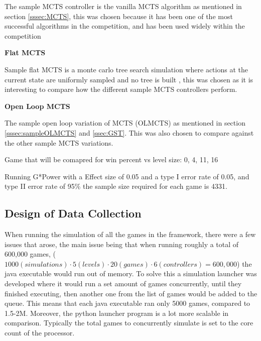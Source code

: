 \documentclass[journal]{IEEEtran}
\begin{document}
	The sample MCTS controller is the vanilla MCTS algorithm as mentioned in section \ref{sssec:MCTS}, this was chosen because it has been one of the most successful algorithms in the competition, and has been used widely within the competition \cite{perez20162014, perez2018general}

	\textbf{Flat MCTS}

	Sample flat MCTS is a monte carlo tree search simulation where actions at the current state are uniformly sampled and no tree is built \cite{browne2012survey}, this was chosen as it is interesting to compare how the different sample MCTS controllers perform.

	\textbf{Open Loop MCTS}

	The sample open loop variation of MCTS (OLMCTS) as mentioned in section \ref{sssec:sampleOLMCTS} and \ref{ssec:GST}. This was also chosen to compare against the other sample MCTS variations.




	Game that will be comapred for win percent vs level size:
	0, 4, 11, 16


		Running G*Power with a Effect size of 0.05 and a type I error rate of 0.05, and type II error rate of 95\% the sample size required for each game is 4331.


	
	

	\subsection{Design of Data Collection}
	
	When running the simulation of all the games in the framework, there were a few issues that arose, the main issue being that when running roughly a total of 600,000 games, ($ 1000(simulations) \cdot 5 (levels) \cdot 20 (games) \cdot 6 (controllers) = 600,000$) the java executable would run out of memory.
	To solve this a simulation launcher was developed where it would run a set amount of games concurrently, until they finished executing, then another one from the list of games would be added to the queue. This means that each java executable ran only 5000 games, compared to 1.5-2M. Moreover, the python launcher program is a lot more scalable in comparison.
	Typically the total games to concurrently simulate is set to the core count of the processor.
\end{document}
